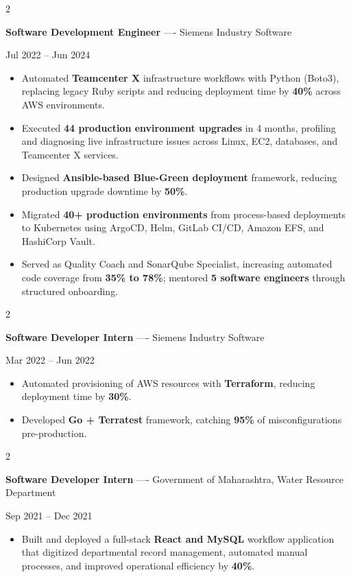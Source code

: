 \documentclass[10pt, letterpaper]{article}
\newenvironment{highlights}{
    \begin{itemize}[
        topsep=0.10 cm,
        parsep=0.06 cm,
        partopsep=0pt,
        itemsep=0.06 cm,
        leftmargin=12pt
    ]
}{
    \end{itemize}
}
\newenvironment{twocolentry}[2][]{
    \onecolentry
    \def\secondColumn{#2}
    \setcolumnwidth{\fill, 4.5 cm}
    \begin{paracol}{2}
}{
    \switchcolumn \raggedleft \secondColumn
    \end{paracol}
    \endonecolentry
}
\begin{document}
\vspace{0.15 cm}

\begin{twocolentry}{Jul 2022 -- Jun 2024}
\textbf{Software Development Engineer} ---- Siemens Industry Software
\end{twocolentry}
\begin{highlights}
  \item Automated \textbf{Teamcenter X} infrastructure workflows with Python (Boto3), replacing legacy Ruby scripts and reducing deployment time by \textbf{40\%} across AWS environments.
  \item Executed \textbf{44 production environment upgrades} in 4 months, profiling and diagnosing live infrastructure issues across Linux, EC2, databases, and Teamcenter X services.
  \item Designed \textbf{Ansible-based Blue-Green deployment} framework, reducing production upgrade downtime by \textbf{50\%}.
  \item Migrated \textbf{40+ production environments} from process-based deployments to Kubernetes using ArgoCD, Helm, GitLab CI/CD, Amazon EFS, and HashiCorp Vault.
  \item Served as Quality Coach and SonarQube Specialist, increasing automated code coverage from \textbf{35\% to 78\%}; mentored \textbf{5 software engineers} through structured onboarding.
\end{highlights}

\vspace{0.15 cm}

\begin{twocolentry}{Mar 2022 -- Jun 2022}
\textbf{Software Developer Intern} ---- Siemens Industry Software
\end{twocolentry}
\begin{highlights}
  \item Automated provisioning of AWS resources with \textbf{Terraform}, reducing deployment time by \textbf{30\%}.
  \item Developed \textbf{Go + Terratest} framework, catching \textbf{95\%} of misconfigurations pre-production.
\end{highlights}

\vspace{0.15 cm}

\begin{twocolentry}{Sep 2021 -- Dec 2021}
\textbf{Software Developer Intern} ---- Government of Maharashtra, Water Resource Department
\end{twocolentry}
\begin{highlights}
  \item Built and deployed a full-stack \textbf{React and MySQL} workflow application that digitized departmental record management, automated manual processes, and improved operational efficiency by \textbf{40\%}.
\end{highlights}
\end{document}

